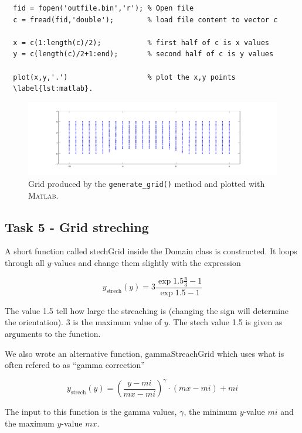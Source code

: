 \documentclass[paper=a4, fontsize=12pt]{article} %
\begin{document}
\begin{lstlisting}
  fid = fopen('outfile.bin','r'); % Open file
  c = fread(fid,'double');        % load file content to vector c

  x = c(1:length(c)/2);           % first half of c is x values
  y = c(length(c)/2+1:end);       % second half of c is y values

  plot(x,y,'.')                   % plot the x,y points
  \label{lst:matlab}.
\end{lstlisting}

\begin{figure}[H]
  \centering
  \includegraphics[width=\textwidth]{gridpoints.pdf}
  \caption{Grid produced by the \texttt{generate\_grid()} method and plotted with \textsc{Matlab.}\label{fig:grid}}
\label{fig:grid}
\end{figure}

\subsection*{Task 5 - Grid streching}

A short function called stechGrid inside the Domain class is constructed. It loops through all $y$-values and change them slightly with the expression

$$ y_\textrm{strech}(y) = 3 \frac{\exp{1.5\frac{y}{3}}-1}{\exp{1.5}-1}$$

The value 1.5 tell how large the streaching is (changing the sign will determine the orientation). 3 is the maximum value of $y$. The stech value 1.5 is given as arguments to the function.

We also wrote an alternative function, gammaStreachGrid which uses what is often refered to as ``gamma correction''

$$ y_\textrm{strech}(y) =  \left ( \frac{y-mi}{mx-mi}\right )^\gamma \cdot (mx-mi) + mi$$

The input to this function is the gamma values, $\gamma$, the minimum $y$-value $mi$ and the maximum $y$-value $mx$.
\end{document}
